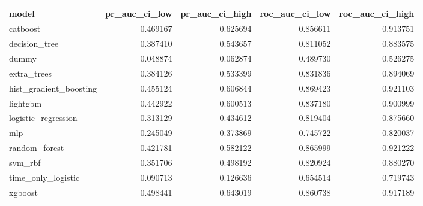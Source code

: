 \begin{tabular}{lrrrr}
\toprule
model & pr\_auc\_ci\_low & pr\_auc\_ci\_high & roc\_auc\_ci\_low & roc\_auc\_ci\_high \\
\midrule
catboost & 0.469167 & 0.625694 & 0.856611 & 0.913751 \\
decision\_tree & 0.387410 & 0.543657 & 0.811052 & 0.883575 \\
dummy & 0.048874 & 0.062874 & 0.489730 & 0.526275 \\
extra\_trees & 0.384126 & 0.533399 & 0.831836 & 0.894069 \\
hist\_gradient\_boosting & 0.455124 & 0.606844 & 0.869423 & 0.921103 \\
lightgbm & 0.442922 & 0.600513 & 0.837180 & 0.900999 \\
logistic\_regression & 0.313129 & 0.434612 & 0.819404 & 0.875660 \\
mlp & 0.245049 & 0.373869 & 0.745722 & 0.820037 \\
random\_forest & 0.421781 & 0.582122 & 0.865999 & 0.921222 \\
svm\_rbf & 0.351706 & 0.498192 & 0.820924 & 0.880270 \\
time\_only\_logistic & 0.090713 & 0.126636 & 0.654514 & 0.719743 \\
xgboost & 0.498441 & 0.643019 & 0.860738 & 0.917189 \\
\bottomrule
\end{tabular}
